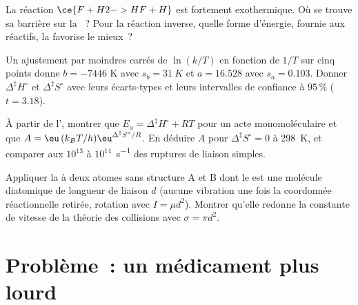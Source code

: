 \begin{exercise}[$\star\star$]\label{exo:b3:rate-theories:9}
La réaction $\ce{F + H2 -> HF + H}$ est fortement exothermique. Où se
trouve sa barrière sur la ~? Pour la
réaction inverse, quelle forme d'énergie, fournie aux réactifs, la
favorise le mieux~?
\end{exercise}

\begin{exercise}[$\star\star\star$]\label{exo:b3:rate-theories:10}
Un ajustement par moindres carrés de $\ln(k/T)$ en fonction de $1/T$ sur
cinq points donne $b = -7446$ K
avec $s_b = \qty{31}{K}$ et $a = 16.528$ avec $s_a = 0.103$. Donner
$\Delta^{\ddagger}H^\circ$ et $\Delta^{\ddagger}S^\circ$ avec leurs
écarts-types et leurs intervalles de confiance à 95\,\% ($t = 3.18$).
\end{exercise}

\begin{exercise}[$\star\star\star$]\label{exo:b3:rate-theories:11}
À partir de l', montrer que $E_a = \Delta^{\ddagger}H^\circ + RT$
pour un acte monomoléculaire et que $A = \eu\,(k_BT/h)\eu^{\Delta^{\ddagger}S^\circ/R}$.
En déduire $A$ pour $\Delta^{\ddagger}S^\circ = 0$ à
\qty{298}{K}, et comparer aux $10^{13}$ à $10^{14}$~\unit{s^{-1}} des
ruptures de liaison simples.
\end{exercise}

\begin{exercise}[$\star\star\star$]\label{exo:b3:rate-theories:12}
Appliquer la  à deux atomes sans
structure A et B dont le  est une molécule diatomique de
longueur de liaison $d$ (aucune vibration une fois la coordonnée
réactionnelle retirée, rotation avec $I = \mu d^2$). Montrer qu'elle
redonne la constante de vitesse de la théorie des collisions avec
$\sigma = \pi d^2$.
\end{exercise}

\section{Problème~: un médicament plus lourd}

